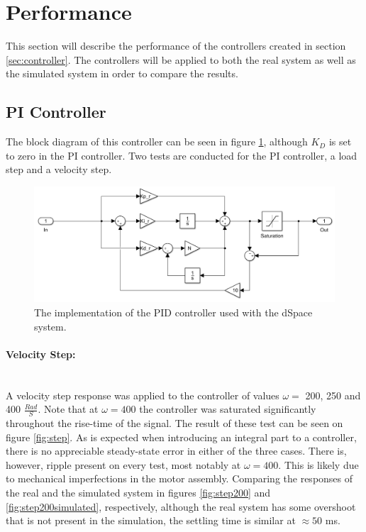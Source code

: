 \section{Performance}
This section will describe the performance of the controllers created in section \ref{sec:controller}.
The controllers will be applied to both the real system as well as the simulated system in order to compare the results.

\subsection{PI Controller}
The block diagram of this controller can be seen in figure \ref{fig:pidcontroller}, although $K_D$ is set to zero in the PI controller.
Two tests are conducted for the PI controller, a load step and a velocity step.

\begin{figure}[!h]
	\centering
	\includegraphics[width=.75\linewidth]{graphics/pid_controller}
	\caption{The implementation of the PID controller used with the dSpace system.}
	\label{fig:pidcontroller}
\end{figure}

\paragraph{Velocity Step:}~\\
A velocity step response was applied to the controller of values $\omega =$ 200, 250 and 400 $\frac{Rad}{S}$.
Note that at $\omega=400$ the controller was saturated significantly throughout the rise-time of the signal.
The result of these test can be seen on figure \ref{fig:step}.
As is expected when introducing an integral part to a controller, there is no appreciable steady-state error in either of the three cases.
There is, however, ripple present on every test, most notably at $\omega = 400$.
This is likely due to mechanical imperfections in the motor assembly.
Comparing the responses of the real and the simulated system in figures \ref{fig:step200} and \ref{fig:step200simulated}, respectively, although the real system has some overshoot that is not present in the simulation, the settling time is similar at $\approx50$ ms.

